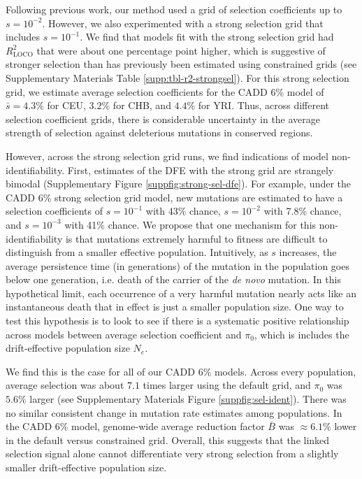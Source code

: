 \documentclass[11pt]{article}
\begin{document}
Following previous work, our method used a grid of selection coefficients up to
$s=10^{-2}$. However, we also experimented with a strong selection grid that
includes $s=10^{-1}$. We find that models fit with the strong selection grid
had $R_\text{LOCO}^2$ that were about one percentage point higher, which is
suggestive of stronger selection than has previously been estimated using
constrained grids (see Supplementary Materials Table
\ref{supp:tbl-r2-strongsel}). For this strong selection grid, we estimate
average selection coefficients for the CADD 6\% model of $\bar{s} = 4.3\%$ for
CEU, $3.2\%$ for CHB, and $4.4\%$ for YRI. Thus, across different selection
coefficient grids, there is considerable uncertainty in the average strength of
selection against deleterious mutations in conserved regions.

However, across the strong selection grid runs, we find indications of model
non-identifiability. First, estimates of the DFE with the strong grid are
strangely bimodal (Supplementary Figure \ref{suppfig:strong-sel-dfe}). For
example, under the CADD 6\% strong selection grid model, new mutations are
estimated to have a selection coefficients of $s = 10^{-1}$ with 43\% chance,
$s=10^{-2}$ with 7.8\% chance, and $s=10^{-3}$ with 41\% chance. We propose
that one mechanism for this non-identifiability is that mutations extremely
harmful to fitness are difficult to distinguish from a smaller effective
population. Intuitively, as $s$ increases, the average persistence time (in
generations) of the mutation in the population goes below one generation, i.e.
death of the carrier of the \emph{de novo} mutation. In this hypothetical
limit, each occurrence of a very harmful mutation nearly acts like an
instantaneous death that in effect is just a smaller population size. One way
to test this hypothesis is to look to see if there is a systematic positive
relationship across models between average selection coefficient and $\pi_0$,
which is includes the drift-effective population size $N_e$.

We find this is the case for all of our CADD 6\% models. Across every
population, average selection was about $7.1$ times larger using the default
grid, and $\pi_0$ was $5.6\%$ larger (see Supplementary Materials Figure
\ref{suppfig:sel-ident}). There was no similar consistent change in mutation
rate estimates among populations. In the CADD 6\% model, genome-wide average
reduction factor $\bar{B}$ was $\approx 6.1\%$ lower in the default versus
constrained grid. Overall, this suggests that the linked selection signal alone
cannot differentiate very strong selection from a slightly smaller
drift-effective population size.
\end{document}
